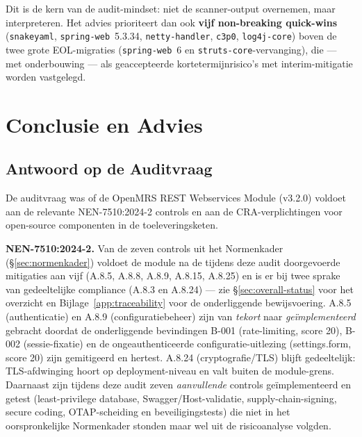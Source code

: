 \documentclass[12pt, a4paper]{report}
\begin{document}
Dit is de kern van de audit-mindset: niet de scanner-output overnemen, maar
interpreteren. Het advies prioriteert dan ook \textbf{vijf non-breaking quick-wins}
(\texttt{snakeyaml}, \texttt{spring-web}~5.3.34, \texttt{netty-handler},
\texttt{c3p0}, \texttt{log4j-core}) boven de twee grote EOL-migraties
(\texttt{spring-web}~6 en \texttt{struts-core}-vervanging), die --- met onderbouwing
--- als geaccepteerde kortetermijnrisico's met interim-mitigatie worden vastgelegd.

\newpage

\chapter{Conclusie en Advies}
\label{ch:conclusie}

\section{Antwoord op de Auditvraag}
\label{sec:auditvraag}

De auditvraag was of de OpenMRS REST Webservices Module (v3.2.0) voldoet aan
de relevante NEN-7510:2024-2 controls en aan de CRA-verplichtingen voor
open-source componenten in de toeleveringsketen.

\textbf{NEN-7510:2024-2.} Van de zeven controls uit het Normenkader
(\S\ref{sec:normenkader}) voldoet de module na de tijdens deze audit
doorgevoerde mitigaties aan vijf (A.8.5, A.8.8, A.8.9, A.8.15, A.8.25) en is
er bij twee sprake van gedeeltelijke compliance (A.8.3 en A.8.24) --- zie
\S\ref{sec:overall-status} voor het overzicht en
Bijlage~\ref{app:traceability} voor de onderliggende bewijsvoering. A.8.5
(authenticatie) en A.8.9 (configuratiebeheer) zijn van \emph{tekort} naar
\emph{geïmplementeerd} gebracht doordat de onderliggende bevindingen B-001
(rate-limiting, score 20), B-002 (sessie-fixatie) en de ongeauthenticeerde
configuratie-uitlezing (settings.form, score 20) zijn gemitigeerd en hertest.
A.8.24 (cryptografie/TLS) blijft gedeeltelijk: TLS-afdwinging hoort op
deployment-niveau en valt buiten de module-grens. Daarnaast zijn tijdens deze
audit zeven \emph{aanvullende} controls geïmplementeerd en getest
(least-privilege database, Swagger/Host-validatie, supply-chain-signing,
secure coding, OTAP-scheiding en beveiligingstests) die niet in het
oorspronkelijke Normenkader stonden maar wel uit de risicoanalyse volgden.
\end{document}
